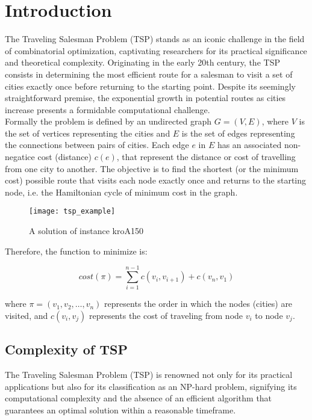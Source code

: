 \chapter{Introduction}

The Traveling Salesman Problem (TSP) stands as an iconic challenge in the field of combinatorial optimization,
captivating researchers for its practical significance and theoretical complexity. Originating in the early 20th century,
the TSP consists in determining the most efficient route for a salesman to visit a set of cities exactly once before returning 
to the starting point. Despite its seemingly straightforward premise, the exponential growth in potential routes as cities 
increase presents a formidable computational challenge.\\
Formally the problem is defined by an undirected graph $G = (V,E)$, where $V$ is the set of vertices representing the cities and
$E$ is the set of edges representing the connections between pairs of cities. Each edge $e$ in $E$ 
has an associated non-negatice cost (distance) $c(e)$, that represent the distance or cost of travelling from one
city to another. The objective is to find the shortest (or the minimum cost) possible route that visits each node exactly
once and returns to the starting node, i.e. the Hamiltonian cycle of minimum cost in the graph.\\

\begin{figure}[htbp]
	\centering
	\texttt{[image: tsp\_example]}
	\caption{A solution of instance kroA150}
\end{figure}

Therefore, the function to minimize is:

\begin{equation}
    cost(\pi) = \sum_{i=1}^{n-1} c(v_i, v_{i+1}) + c(v_n,v_1)
\end{equation}

where $\pi = (v_1,v_2,\ldots,v_n)$ represents the order in which the nodes (cities) are visited, and $c(v_i,v_j)$ 
represents the cost of traveling from node $v_i$ to node $v_j$.

\section{Complexity of TSP}

The Traveling Salesman Problem (TSP) is renowned not only for its practical applications but also for its classification as an NP-hard problem, signifying its computational complexity and the absence of an efficient algorithm that guarantees an optimal solution within a reasonable timeframe.

